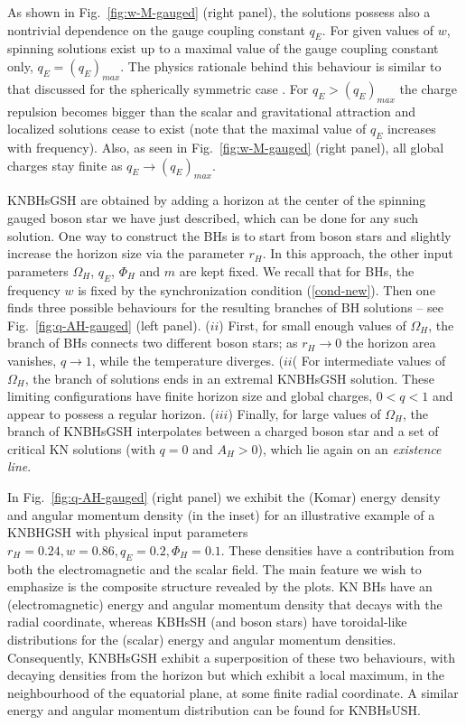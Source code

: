 As shown in Fig.~\ref{fig:w-M-gauged} (right panel), 
the solutions possess also a nontrivial dependence on 
the gauge coupling constant $q_E$.
For given values of $w$,
spinning solutions exist up to a maximal
value of the gauge coupling constant only, $q_E=(q_E)_{max}$.
The physics rationale behind this behaviour 
is similar to that discussed for the spherically symmetric case 
\cite{Jetzer:1989av,Pugliese:2013gsa}.
For $q_E>(q_E)_{max}$ the charge repulsion  becomes bigger than
  the scalar and gravitational attraction and localized solutions cease to exist  
(note that the maximal value of $q_E$
increases with frequency).
Also, as seen in Fig.~\ref{fig:w-M-gauged} (right panel),
all global charges stay finite as $q_E\to (q_E)_{max}$.

\bigskip

KNBHsGSH are obtained by adding a horizon at the center of the spinning gauged boson star  
we have just described, which can be done for  any such  solution.
One way to construct the BHs
  is to  start from  boson stars 
and slightly increase the horizon size via the parameter $r_H$.
In this approach, the other input parameters 
$\Omega_H$, $q_E$,  $\Phi_H$ and $m$
are kept fixed. 
We recall that for BHs, the frequency $w$ is fixed by the synchronization condition (\ref{cond-new}).
Then one finds three 
possible behaviours for
the resulting branches of BH solutions -- see Fig.~\ref{fig:q-AH-gauged} (left panel).
($ii$) First, for small enough values of $\Omega_H$,
 the branch of BHs connects two different boson stars; 
as $r_H\to 0$ the horizon area vanishes, $q\to 1$, while the temperature
 diverges.
($ii$( For intermediate values of  $\Omega_H$,
the branch of solutions ends in an extremal KNBHsGSH solution. 
These limiting configurations have finite
horizon size   and global charges, $0<q<1$ and appear to possess 
a regular horizon.
($iii$) Finally, for large values of $\Omega_H$,
the branch of  KNBHsGSH interpolates between 
a charged boson star and a set of critical KN solutions (with $q=0$ and $A_H>0$), which lie again 
on an {\it existence line}. 

 In Fig.~\ref{fig:q-AH-gauged} (right panel) we exhibit the (Komar) energy density and angular momentum density (in the inset) for an illustrative example of a KNBHGSH  with physical input parameters 
$r_H=0.24, w =0.86, q_E =0.2, \Phi_H=0.1$. 
These densities have a contribution from both the electromagnetic and the scalar field. The main feature we wish to emphasize is the composite structure revealed by the plots. KN BHs have an (electromagnetic) energy and angular momentum density that decays with the radial coordinate, whereas KBHsSH 
(and boson stars)
have toroidal-like distributions for the (scalar) energy and angular momentum densities. 
Consequently, KNBHsGSH exhibit a superposition of these two behaviours, with decaying densities from the horizon but which exhibit a local maximum, in the neighbourhood of the equatorial plane, at some finite radial coordinate. 
A similar energy and angular momentum distribution can be found for KNBHsUSH.  

